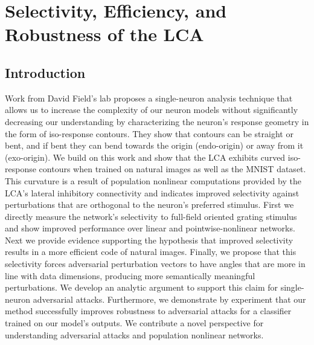 \chapter{Selectivity, Efficiency, and Robustness of the LCA}

\section{Introduction}
Work from David Field's lab \parencite{golden2016conjectures,vilankar2017selectivity} proposes a single-neuron analysis technique that allows us to increase the complexity of our neuron models without significantly decreasing our understanding by characterizing the neuron’s response geometry in the form of iso-response contours.
They show that contours can be straight or bent, and if bent they can bend towards the origin (endo-origin) or away from it (exo-origin).
We build on this work and show that the LCA exhibits curved iso-response contours when trained on natural images as well as the MNIST dataset.
This curvature is a result of population nonlinear computations provided by the LCA's lateral inhibitory connectivity and indicates improved selectivity against perturbations that are orthogonal to the neuron's preferred stimulus.
First we directly measure the network's selectivity to full-field oriented grating stimulus and show improved performance over linear and pointwise-nonlinear networks.
Next we provide evidence supporting the hypothesis that improved selectivity results in a more efficient code of natural images.
Finally, we propose that this selectivity forces adversarial perturbation vectors to have angles that are more in line with data dimensions, producing more semantically meaningful perturbations.
We develop an analytic argument to support this claim for single-neuron adversarial attacks.
Furthermore, we demonstrate by experiment that our method successfully improves robustness to adversarial attacks for a classifier trained on our model's outputs.
We contribute a novel perspective for understanding adversarial attacks and population nonlinear networks. 


